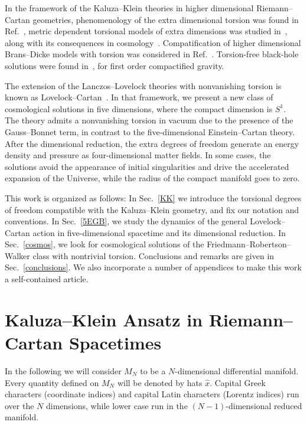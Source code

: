 \documentclass[aps,prd,12pt,superscriptaddress,showpacs,showkeys,longbibliography,reprint,nofootinbib]{revtex4-1}
\begin{document}
In the framework of the Kaluza--Klein theories in higher dimensional Riemann--Cartan geometries, phenomenology of the extra dimensional torsion was found in Ref.~\cite{Kalinowski:1980da}, metric dependent torsional models of extra dimensions was studied in~\cite{Shankar:2012vd}, along with its consequences in cosmology~\cite{Chen:2009ep}. Compatification of higher dimensional Brans--Dicke models with torsion was considered in Ref.~\cite{German:1993bq}. Torsion-free black-hole solutions were found in~\cite{Aros:2007nn}, for first order compactified gravity.

The extension of the Lanczos--Lovelock theories with nonvanishing torsion is known as Lovelock--Cartan~\cite{Mardones:1990qc}. In that framework, we present a new class of cosmological solutions in five dimensions, where the compact dimension is $S^1$. The theory admits a nonvanishing torsion in vacuum due to the presence of the Gauss--Bonnet term, in contrast to the five-dimensional Einstein--Cartan theory. After the dimensional reduction, the extra degrees of freedom generate an energy density and pressure as four-dimensional matter fields. In some cases, the solutions avoid the appearance of initial singularities and drive the accelerated expansion of the Universe, while the radius of the compact manifold goes to zero.  

This work is organized as follows: In Sec.~\ref{KK} we introduce the torsional degrees of freedom compatible with the Kaluza--Klein geometry, and fix our notation and conventions. In Sec.~\ref{5EGB}, we study the dynamics of the general Lovelock--Cartan action in five-dimensional spacetime and its dimensional reduction. In Sec.~\ref{cosmos}, we look for cosmological solutions of the Friedmann--Robertson--Walker class with nontrivial torsion. Conclusions and remarks are given in Sec.~\ref{conclusions}. We also incorporate a number of appendices to make this work a self-contained article.


\section{Kaluza--Klein Ansatz in Riemann--Cartan Spacetimes\label{KK}}

In the following we will consider $M_N$ to be a $N$-dimensional differential manifold. Every quantity defined on $M_N$ will be denoted by hats $\hat{x}$. Capital Greek characters (coordinate indices) and capital Latin characters (Lorentz indices) run over the $N$ dimensions, while lower case run in the $(N-1)$-dimensional reduced manifold.
\end{document}
